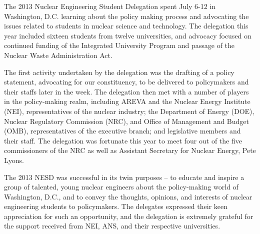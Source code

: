 The 2013 Nuclear Engineering Student Delegation spent July 6-12 in Washington,
D.C. learning about the policy making process and advocating the issues related
to students in nuclear science and technology. The delegation this year included
sixteen students from twelve universities, and advocacy focused on continued
funding of the Integrated University Program and passage of the Nuclear Waste
Administration Act.

The first activity undertaken by the delegation was the drafting of a policy
statement, advocating for our constituency, to be delivered to policymakers and
their staffs later in the week. The delegation then met with a number of players
in the policy-making realm, including AREVA and the Nuclear Energy Institute
(NEI), representatives of the nuclear industry; the Department of Energy (DOE),
Nuclear Regulatory Commission (NRC), and Office of Management and Budget (OMB),
representatives of the executive branch; and legislative members and their
staff. The delegation was fortunate this year to meet four out of the five
commissioners of the NRC as well as Assistant Secretary for Nuclear Energy, Pete
Lyons.

The 2013 NESD was successful in its twin purposes – to educate and inspire a
group of talented, young nuclear engineers about the policy-making world of
Washington, D.C., and to convey the thoughts, opinions, and interests of nuclear
engineering students to policymakers. The delegates expressed their keen
appreciation for such an opportunity, and the delegation is extremely grateful
for the support received from NEI, ANS, and their respective universities.
